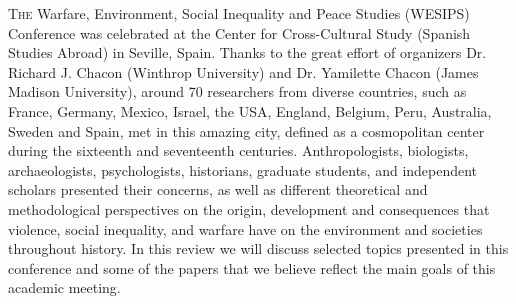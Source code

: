 	
\lettrine[nindent=0em,lines=3]{T}{he} Warfare, Environment, Social Inequality and Peace Studies (WESIPS) Conference was celebrated at the Center for Cross-Cultural Study (Spanish Studies Abroad) in Seville, Spain. Thanks to the great effort of organizers Dr. Richard J. Chacon (Winthrop University) and Dr. Yamilette Chacon (James Madison University), around 70 researchers from diverse countries, such as France, Germany, Mexico, Israel, the USA, England, Belgium, Peru, Australia, Sweden and Spain, met in this amazing city, defined as a cosmopolitan center during the sixteenth and seventeenth centuries. Anthropologists, biologists, archaeologists, psychologists, historians, graduate students, and independent scholars presented their concerns, as well as different theoretical and methodological perspectives on the origin, development and consequences that violence, social inequality, and warfare have on the environment and societies throughout history. In this review we will discuss selected topics presented in this conference and some of the papers that we believe reflect the main goals of this academic meeting. 


